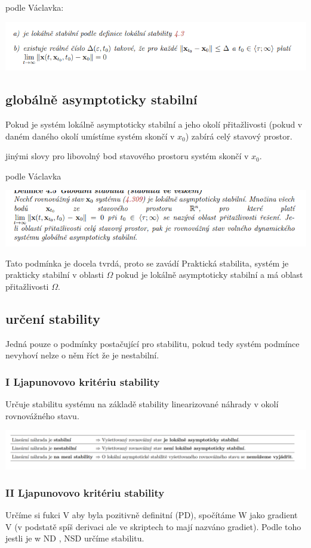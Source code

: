 podle Václavka:

\includegraphics{img/vaclavek. lok.asypt..png}

\subsection{globálně  asymptoticky stabilní}
Pokud je systém lokálně asymptoticky stabilní a jeho okolí přitažlivosti (pokud v daném daného okolí umístíme systém skončí v $x_0$) zabírá
celý stavový prostor.

jinými slovy pro libovolný bod stavového prostoru systém skončí v $x_0$.

podle Václavka

\includegraphics{img/vaclavek.golbal.png}

Tato podmínka je docela tvrdá, proto se zavádí Praktická stabilita, systém je prakticky stabilní v oblasti $\Omega$ pokud je lokálně asymptoticky stabilní a má oblast přitažlivosti $\Omega$.

\subsection*{určení stability}
Jedná pouze o podmínky postačující pro stabilitu, pokud tedy systém podmínce nevyhoví nelze o něm říct že je nestabilní.
\subsubsection{I Ljapunovovo kritériu stability}
Určuje stabilitu systému na základě stability linearizované náhrady v okolí rovnovážného stavu.

\noindent \includegraphics[scale = 0.6]{img/Ljap.1.png}

\subsubsection{II Ljapunovovo kritériu stability}
Určíme si fukci V aby byla pozitivně
definitní (PD), spočítáme W jako gradient V (v podstatě spíš derivaci ale ve skriptech to mají nazváno gradiet). Podle toho jestli je w ND , NSD určíme stabilitu.


